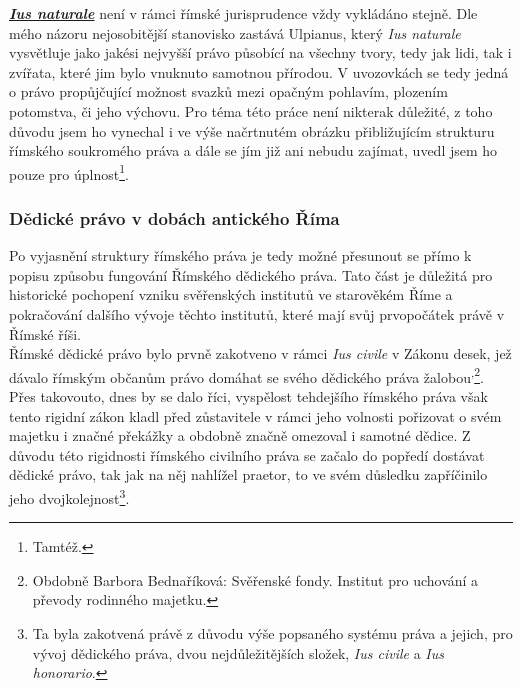 \documentclass{article}
\begin{document}
\underline{\textbf{\textit{Ius naturale}}} není v rámci římské jurisprudence vždy vykládáno stejně. Dle mého názoru nejosobitější stanovisko zastává Ulpianus, který \textit{Ius naturale} vysvětluje jako jakési nejvyšší právo působící na všechny tvory, tedy jak lidi, tak i zvířata, které jim bylo vnuknuto samotnou přírodou. V uvozovkách se tedy jedná o právo propůjčující možnost svazků mezi opačným pohlavím, plozením potomstva, či jeho výchovu. Pro téma této práce není nikterak důležité, z toho důvodu jsem ho vynechal i ve výše načrtnutém obrázku přibližujícím strukturu římského soukromého práva a dále se jím již ani nebudu zajímat, uvedl jsem ho pouze pro úplnost\footnote{Tamtéž.}.\\


\subsubsection{Dědické právo v dobách antického Říma}

Po vyjasnění struktury římského práva je tedy možné přesunout se přímo k popisu způsobu fungování Římského dědického práva. Tato část je důležitá pro historické pochopení vzniku svěřenských institutů ve starověkém Říme a pokračování dalšího vývoje těchto institutů, které mají svůj prvopočátek právě v Římské říši. \\


Římské dědické právo bylo prvně zakotveno v rámci \textit{Ius civile} v Zákonu \MakeUppercase{} desek, jež dávalo římským občanům právo domáhat se svého dědického práva žalobou\textsuperscript{,}\footnote{Obdobně Barbora Bednaříková: Svěřenské fondy. Institut pro uchování a převody rodinného majetku.}. Přes takovouto, dnes by se dalo říci, vyspělost tehdejšího římského práva však tento rigidní zákon kladl před zůstavitele v rámci jeho volnosti pořizovat o svém majetku i značné překážky a obdobně značně omezoval i samotné dědice. Z důvodu této rigidnosti římského civilního práva se začalo do popředí dostávat dědické právo, tak jak na něj nahlížel praetor, to ve svém důsledku zapříčinilo jeho dvojkolejnost\footnote{Ta byla zakotvená právě z důvodu výše popsaného systému práva a jejich, pro vývoj dědického práva, dvou nejdůležitějších složek, \textit{Ius civile} a \textit{Ius honorario}.}.\\
\end{document}
